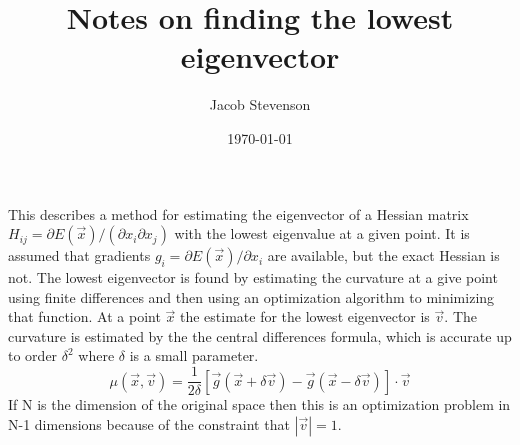 \documentclass[a4paper]{article}
\title{Notes on finding the lowest eigenvector}
\author{Jacob Stevenson}
\date{\today}
\begin{document}
\maketitle


This describes a method for estimating the eigenvector of a Hessian matrix $H_{ij} = \partial E(\vec{x}) / (\partial{x_i}\partial x_j)$ with the lowest eigenvalue at a given point.  It is assumed that gradients $g_i = \partial E(\vec{x}) / \partial x_i$
are available, but the exact Hessian is not.
The lowest eigenvector is found by estimating the curvature
at a give point using finite differences and then using an optimization
algorithm to minimizing that function.  At a point $\vec{x}$ the estimate
for the lowest eigenvector is $\vec{v}$.  The curvature is estimated
by the the central differences formula, which is accurate up to order $\delta^2$ where $\delta$ is a small parameter.
\begin{equation}
\mu(\vec{x}, \vec{v}) = \frac{1}{2 \delta} 
\left[ \vec{g}(\vec{x} + \delta \vec{v}) - 
\vec{g}(\vec{x} - \delta \vec{v}) \right] \cdot \vec{v}
\end{equation}
If N is the dimension of the original space then this is an optimization problem in N-1 dimensions because of the constraint that $\left|\vec{v} \right| = 1$.
\end{document}

